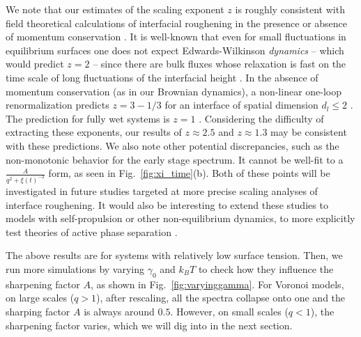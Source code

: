 \documentclass[twoside,twocolumn,9pt]{article}
\begin{document}
We note that our estimates of the scaling exponent $z$ is roughly consistent with field theoretical calculations of interfacial roughening in the presence or absence of momentum conservation \cite{shinozaki1993dispersion,bray2001interface,fausti2021capillary,besse2023interface}.
It is well-known that even for small fluctuations in equilibrium surfaces one does not expect Edwards-Wilkinson \emph{dynamics} -- which would predict $z=2$ -- since there are bulk fluxes whose relaxation is fast on the time scale of long fluctuations of the interfacial height \cite{bray2001interface,shinozaki1993dispersion}.
In the absence of momentum conservation (as in our Brownian dynamics), a non-linear one-loop renormalization predicts $z=3-1/3$ for an interface of spatial dimension $d_l\leq2$ \cite{besse2023interface}. The prediction for fully wet systems is $z=1$ \cite{caballero2024interface}. 
Considering  the difficulty of extracting these exponents, our results of $z\approx 2.5$ and $z\approx 1.3$ may be consistent with these predictions.
We also note other potential discrepancies, such as the non-monotonic behavior for the early stage spectrum.
It cannot be well-fit to a $\frac{A}{q^2+\xi(t)^{-2}}$ form, as seen in Fig.~\ref{fig:xi_time}(b).
Both of these points will be investigated in future studies targeted at more precise scaling analyses of interface roughening.
It would also be interesting to extend these studies to models with self-propulsion or other non-equilibrium dynamics, to more explicitly test theories of active phase separation \cite{caballero2024interface,bray2001interface,besse2023interface}.

The above results are for systems with relatively low surface tension. Then, we run more simulations by varying $\gamma_0$ and $k_BT$ to check how they influence the sharpening factor $A$, as shown in Fig.~\ref{fig:varyinggamma}. For Voronoi models, on large scales ($q>1$), after rescaling, all the spectra collapse onto one and the sharping factor $A$ is always around $0.5$. However, on small scales ($q<1$), the sharpening factor varies, which we will dig into in the next section. 
\end{document}

